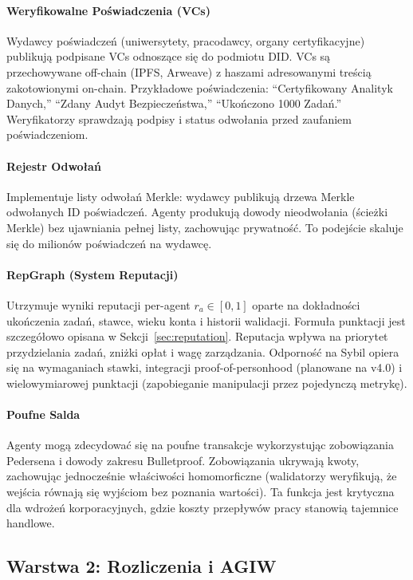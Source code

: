 \documentclass[11pt]{article}
\begin{document}
\paragraph{Weryfikowalne Poświadczenia (VCs)} Wydawcy poświadczeń (uniwersytety, pracodawcy, organy certyfikacyjne) publikują podpisane VCs odnoszące się do podmiotu DID. VCs są przechowywane off-chain (IPFS, Arweave) z haszami adresowanymi treścią zakotowionymi on-chain. Przykładowe poświadczenia: ``Certyfikowany Analityk Danych,'' ``Zdany Audyt Bezpieczeństwa,'' ``Ukończono 1000 Zadań.'' Weryfikatorzy sprawdzają podpisy i status odwołania przed zaufaniem poświadczeniom.

\paragraph{Rejestr Odwołań} Implementuje listy odwołań Merkle: wydawcy publikują drzewa Merkle odwołanych ID poświadczeń. Agenty produkują dowody nieodwołania (ścieżki Merkle) bez ujawniania pełnej listy, zachowując prywatność. To podejście skaluje się do milionów poświadczeń na wydawcę.

\paragraph{RepGraph (System Reputacji)} Utrzymuje wyniki reputacji per-agent $r_a \in [0,1]$ oparte na dokładności ukończenia zadań, stawce, wieku konta i historii walidacji. Formuła punktacji jest szczegółowo opisana w Sekcji~\ref{sec:reputation}. Reputacja wpływa na priorytet przydzielania zadań, zniżki opłat i wagę zarządzania. Odporność na Sybil opiera się na wymaganiach stawki, integracji proof-of-personhood (planowane na v4.0) i wielowymiarowej punktacji (zapobieganie manipulacji przez pojedynczą metrykę).

\paragraph{Poufne Salda} Agenty mogą zdecydować się na poufne transakcje wykorzystując zobowiązania Pedersena i dowody zakresu Bulletproof. Zobowiązania ukrywają kwoty, zachowując jednocześnie właściwości homomorficzne (walidatorzy weryfikują, że wejścia równają się wyjściom bez poznania wartości). Ta funkcja jest krytyczna dla wdrożeń korporacyjnych, gdzie koszty przepływów pracy stanowią tajemnice handlowe.

\subsection{Warstwa 2: Rozliczenia i AGIW}
\end{document}

